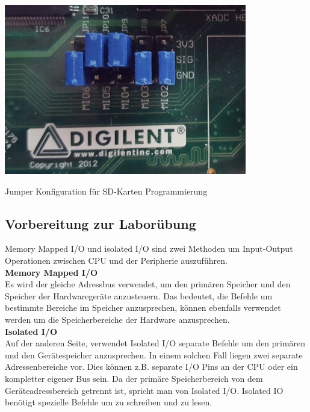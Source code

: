 \begin{minipage}{\textwidth}
    \begin{center}        
        \includegraphics[scale=0.4]{img/sd.jpg} 
    \end{center}
\end{minipage}
\begin{center}
Jumper Konfiguration für SD-Karten Programmierung
\end{center}

\subsection{Vorbereitung zur Laborübung}
Memory Mapped I/O und isolated I/O sind zwei Methoden um Input-Output Operationen zwischen CPU und der Peripherie auszuführen.\\

\textbf{Memory Mapped I/O}\\
Es wird der gleiche Adressbus verwendet, um den primären Speicher und den Speicher der Hardwaregeräte anzusteuern. Das bedeutet, die Befehle um bestimmte Bereiche im Speicher anzusprechen, können ebenfalls verwendet werden um die Speicherbereiche der Hardware anzusprechen.\\

\textbf{Isolated I/O}\\
Auf der anderen Seite, verwendet Isolated I/O separate Befehle um den primären und den Gerätespeicher anzusprechen. In einem solchen Fall liegen zwei separate Adressenbereiche vor. Dies können z.B. separate I/O Pins an der CPU oder ein kompletter eigener Bus sein. Da der primäre Speicherbereich von dem Geräteadressbereich getrennt ist, spricht man von Isolated I/O. Isolated IO benötigt spezielle Befehle um zu schreiben und zu lesen.
